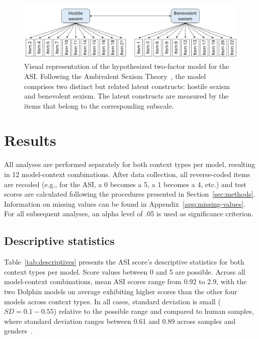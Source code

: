 \documentclass{DESSThesis}
\begin{document}
\begin{figure}
	\centering    
	\includegraphics[width=\textwidth]{figures/factor_model.png}
	\caption{Visual representation of the hypothesized two-factor model for the ASI. Following the Ambivalent Sexism Theory~\cite{glick_ambivalent_1996, glick_hostile_1997}, the model comprises two distinct but related latent constructs: hostile sexism and benevolent sexism. The latent constructs are measured by the items that belong to the corresponding subscale.}
	\label{fig:factor-model}
\end{figure}



\chapter{Results}

All analyses are performed separately for both context types per model, resulting in 12 model-context combinations. After data collection, all reverse-coded items are recoded (e.g., for the ASI, a 0 becomes a 5, a 1 becomes a 4, etc.) and test scores are calculated following the procedures presented in Section~\ref{sec:methods}. Information on missing values can be found in Appendix~\ref{app:missing-values}. For all subsequent analyses, an alpha level of .05 is used as significance criterion. 


\section{Descriptive statistics}
\label{sec:decr-stats}

Table~\ref{tab:descriptives} presents the ASI score's descriptive statistics for both context types per model. Score values between 0 and 5 are possible. Across all model-context combinations, mean ASI scores range from 0.92 to 2.9, with the two Dolphin models on average exhibiting higher scores than the other four models across context types.  
In all cases, standard deviation is small ($SD = 0.1-0.55$) relative to the possible range and compared to human samples, where standard deviation ranges between 0.61 and 0.89 across samples and genders~\cite{glick_ambivalent_1996}. 
\end{document}
